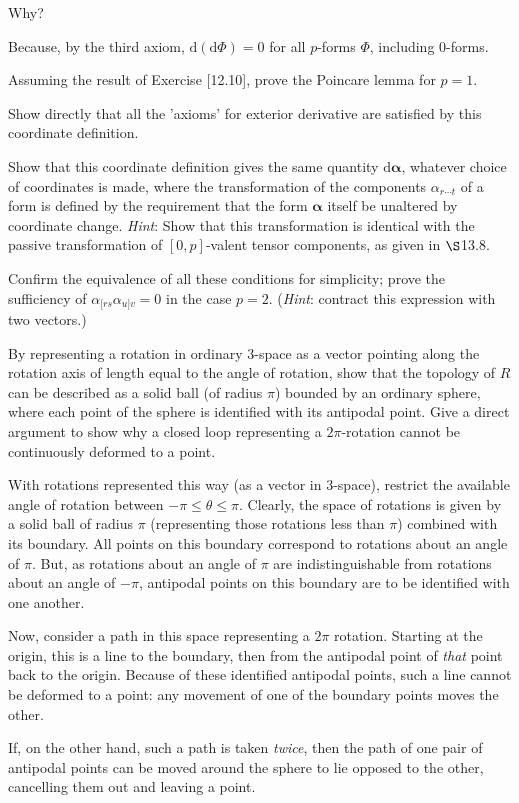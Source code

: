 \documentclass[../the-road-to-reality.tex]{subfiles}
\begin{document}
\begin{questions}
\question Why?

\begin{solution}
        Because, by the third axiom, $\mathrm{d}(\mathrm{d}\Phi) = 0$ for all $p$-forms $\Phi$, including $0$-forms.
\end{solution}

\question Assuming the result of Exercise [12.10], prove the Poincare lemma for $p = 1$.

\question Show directly that all the 'axioms' for exterior derivative are satisfied by this coordinate definition.

\question Show that this coordinate definition gives the same quantity $\mathrm{d}\mathbf{\alpha}$, whatever choice of coordinates is made, where the transformation of the components $\alpha_{r\cdots{t}}$ of a form is defined by the requirement that the form $\mathbf{\alpha}$ itself be unaltered by coordinate change. \textit{Hint}: Show that this transformation is identical with the passive transformation of $[0, p]$-valent tensor components, as given in $\S$13.8.

\question Confirm the equivalence of all these conditions for simplicity; prove the sufficiency of $\alpha_{[rs}\alpha_{u]v} = 0$ in the case $p = 2$. (\textit{Hint}: contract this expression with two vectors.)

\question By representing a rotation in ordinary $3$-space as a vector pointing along the rotation axis of length equal to the angle of rotation, show that the topology of $R$ can be described as a solid ball (of radius $\pi$) bounded by an ordinary sphere, where each point of the sphere is identified with its antipodal point. Give a direct argument to show why a closed loop representing a $2\pi$-rotation cannot be continuously deformed to a point.

\begin{solution}
        With rotations represented this way (as a vector in $3$-space), restrict the available angle of rotation between $-\pi \leq \theta \leq \pi$. Clearly, the space of rotations is given by a solid ball of radius $\pi$ (representing those rotations less than $\pi$) combined with its boundary. All points on this boundary correspond to rotations about an angle of $\pi$. But, as rotations about an angle of $\pi$ are indistinguishable from rotations about an angle of $-\pi$, antipodal points on this boundary are to be identified with one another.

        Now, consider a path in this space representing a $2\pi$ rotation. Starting at the origin, this is a line to the boundary, then from the antipodal point of \textit{that} point back to the origin. Because of these identified antipodal points, such a line cannot be deformed to a point: any movement of one of the boundary points moves the other.

        If, on the other hand, such a path is taken \textit{twice}, then the path of one pair of antipodal points can be moved around the sphere to lie opposed to the other, cancelling them out and leaving a point.
\end{solution}

\end{questions}
	
\end{document}
